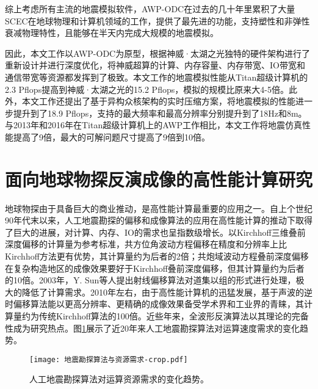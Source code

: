 综上考虑所有主流的地震模拟软件，AWP-ODC在过去的几十年里累积了大量SCEC在地球物理和计算机领域的工作，提供了最先进的功能，支持塑性和非弹性衰减物理特性，且能够在半天内完成大规模的地震模拟。

因此，本文工作以AWP-ODC为原型，根据神威·太湖之光独特的硬件架构进行了重新设计并进行深度优化，将神威超算的计算、内存容量、内存带宽、IO带宽和通信带宽等资源都发挥到了极致。本文工作的地震模拟性能从Titan超级计算机的2.3 Pflops提高到神威·太湖之光的15.2 Pflops，模拟的规模比原来大4-5倍。此外，本文工作还提出了基于异构众核架构的实时压缩方案，将地震模拟的性能进一步提升到了18.9 Pflops，支持的最大频率和最高分辨率分别提升到了18Hz和8m。与2013年和2016年在Titan超级计算机上的AWP工作相比，本文工作将地震仿真性能提高了9倍，最大的可解问题尺寸提高了9倍到10倍。



\section{面向地球物探反演成像的高性能计算研究}


地球物探由于具备巨大的商业推动，是高性能计算最重要的应用之一。自上个世纪90年代末以来，人工地震勘探的偏移和成像算法的应用在高性能计算的推动下取得了巨大的进展，对计算、内存、IO的需求也呈指数级增长。以Kirchhoff三维叠前深度偏移\cite{yilmaz2001seismic}的计算量为参考标准，共方位角波动方程偏移\cite{rickett2002offset}在精度和分辨率上比Kirchhoff方法更有优势，其计算量约为后者的2倍；共炮域波动方程叠前深度偏移\cite{zhang2005theory}在复杂构造地区的成像效果要好于Kirchhoff叠前深度偏移，但其计算量约为后者的10倍。2003年，Y. Sun等人提出射线偏移算法\cite{sun20003}对道集以组的形式进行处理，极大的降低了计算需求。2010年左右，由于高性能计算机的迅猛发展，基于声波的逆时偏移算法\cite{baysal1983reverse}能以更高分辨率、更精确的成像效果备受学术界和工业界的青睐，其计算量约为传统Kirchhoff算法的100倍。近些年来，全波形反演算法\cite{tarantola1984inversion}以其理论的完备性成为研究热点。图\ref{fig:seismicmethod}展示了近20年来人工地震勘探算法对运算速度需求的变化趋势。

\begin{figure}[ht]
\centering
\texttt{[image: 地震勘探算法与资源需求-crop.pdf]}
\caption{人工地震勘探算法对运算资源需求的变化趋势。}
\label{fig:seismicmethod}
\end{figure}


